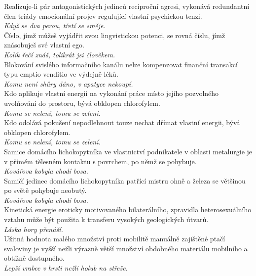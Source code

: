 \begin{multicols}{\value{columnsgames}}
\noindent
Realizuje-li pár antagonistických jedinců reciproční agresi,
vykonává redundantní člen triády emocionální projev regulující
vlastní psychickou tenzi.\\[1 mm]
{\sl Když se dva perou, třetí se směje.}\\

\noindent
Číslo, jímž můžeš vyjádřit svou lingvistickou potenci, se
rovná číslu, jímž znásobuješ své vlastní ego.\\[1 mm]
{\sl Kolik řečí znáš, tolikrát jsi člověkem.}\\

\noindent
Blokování svislého informačního kanálu nelze kompenzovat
finanční transakcí typu emptio venditio ve výdejně léků.\\[1 mm]
{\sl Komu není shůry dáno, v apatyce nekoupí.}\\

\noindent
Kdo aplikuje vlastní energii na vykonání práce místo jejího
pozvolného uvolňování do prostoru, bývá obklopen chlorofylem.\\[1 mm]
{\sl Komu se nelení, tomu se zelení.}\\

\noindent
Kdo odolává pokušení nepodlehnout touze nechat dřímat vlastní
energii, bývá obklopen chlorofylem.\\[1 mm]
{\sl Komu se nelení, tomu se zelení.}\\

\noindent
Samice domácího lichokopytníka ve vlastnictví podnikatele v oblasti
metalurgie je v přímém tělesném kontaktu s povrchem, po němž se
pohybuje.\\[1 mm]
{\sl Kovářova kobyla chodí bosa.}\\

\noindent
Samičí jedinec domácího lichokopytníka patřící mistru ohně
a železa se většinou po světě pohybuje neobutý.\\[1 mm]
{\sl Kovářova kobyla chodí bosa.}\\

\noindent
Kinetická energie eroticky motivovaného bilaterálního, zpravidla
heterosexuálního vztahu může být použita k transferu vysokých
geologických útvarů.\\[1 mm]
{\sl Láska hory přenáší.}\\

\noindent
Užitná hodnota malého množství proti mobilitě manuálně zajištěné
ptačí svaloviny je vyšší nežli výrazně větší množství obdobného materiálu
mobilního a obtížně dostupného.\\[1 mm]
{\sl Lepší vrabec v hrsti nežli holub na střeše.}\\


\end{multicols}
